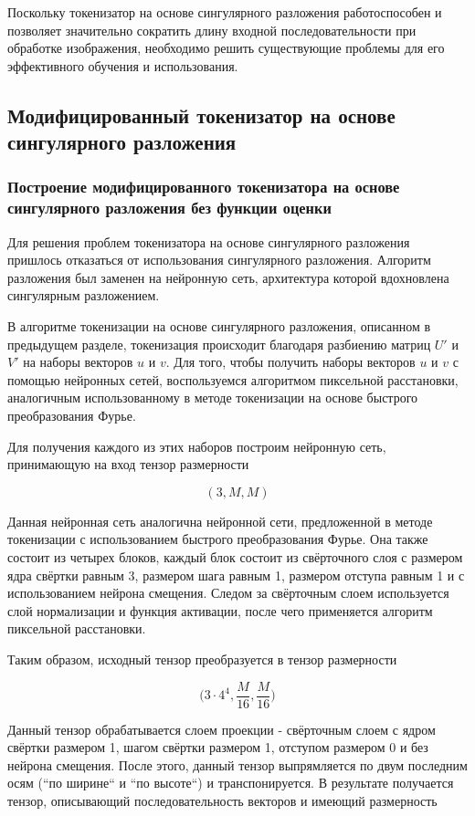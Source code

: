 Поскольку токенизатор на основе сингулярного разложения работоспособен и позволяет значительно сократить длину входной последовательности при обработке изображения, необходимо решить существующие проблемы для его эффективного обучения и использования.

\subsection{Модифицированный токенизатор на основе сингулярного разложения}

\subsubsection{Построение модифицированного токенизатора на основе сингулярного разложения без функции оценки}

Для решения проблем токенизатора на основе сингулярного разложения пришлось отказаться от использования сингулярного разложения. Алгоритм разложения был заменен на нейронную сеть, архитектура которой вдохновлена сингулярным разложением.

В алгоритме токенизации на основе сингулярного разложения, описанном в предыдущем разделе, токенизация происходит благодаря разбиению матриц $U'$ и $V'$ на наборы векторов $u$ и $v$. Для того, чтобы получить наборы векторов $u$ и $v$ с помощью нейронных сетей, воспользуемся алгоритмом пиксельной расстановки, аналогичным использованному в методе токенизации на основе быстрого преобразования Фурье. 

Для получения каждого из этих наборов построим нейронную сеть, принимающую на вход тензор размерности 

$$
(3, M, M)
$$

Данная нейронная сеть аналогична нейронной сети, предложенной в методе токенизации с использованием быстрого преобразования Фурье. Она также состоит из четырех блоков, каждый блок состоит из свёрточного слоя с размером ядра свёртки равным 3, размером шага равным 1, размером отступа равным 1 и с использованием нейрона смещения. Следом за свёрточным слоем используется слой нормализации и функция активации, после чего применяется алгоритм пиксельной расстановки. 

Таким образом, исходный тензор преобразуется в тензор размерности

$$
\Big(3 \cdot 4^4, \dfrac{M}{16}, \dfrac{M}{16}\Big)
$$

Данный тензор обрабатывается слоем проекции - свёрточным слоем с ядром свёртки размером 1, шагом свёртки размером 1, отступом размером 0 и без нейрона смещения. После этого, данный тензор выпрямляется по двум последним осям (``по ширине`` и ``по высоте``) и транспонируется. В результате получается тензор, описывающий последовательность векторов и имеющий размерность

